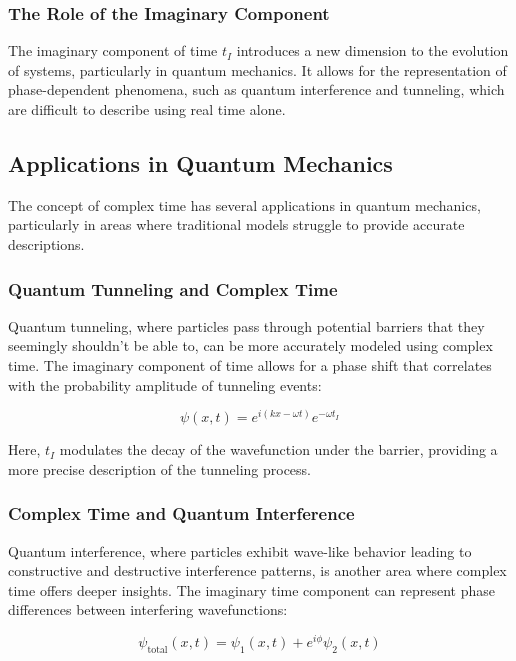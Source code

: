 \documentclass{article}
\begin{document}
\subsubsection{The Role of the Imaginary Component}

The imaginary component of time \( t_I \) introduces a new dimension to the evolution of systems, particularly in quantum mechanics. It allows for the representation of phase-dependent phenomena, such as quantum interference and tunneling, which are difficult to describe using real time alone.

\subsection{Applications in Quantum Mechanics}

The concept of complex time has several applications in quantum mechanics, particularly in areas where traditional models struggle to provide accurate descriptions.

\subsubsection{Quantum Tunneling and Complex Time}

Quantum tunneling, where particles pass through potential barriers that they seemingly shouldn’t be able to, can be more accurately modeled using complex time. The imaginary component of time allows for a phase shift that correlates with the probability amplitude of tunneling events:

\[
\psi(x, t) = e^{i \left( kx - \omega t \right)} e^{- \omega t_I}
\]

Here, \( t_I \) modulates the decay of the wavefunction under the barrier, providing a more precise description of the tunneling process.

\subsubsection{Complex Time and Quantum Interference}

Quantum interference, where particles exhibit wave-like behavior leading to constructive and destructive interference patterns, is another area where complex time offers deeper insights. The imaginary time component can represent phase differences between interfering wavefunctions:

\[
\psi_{\text{total}}(x, t) = \psi_1(x, t) + e^{i \phi} \psi_2(x, t)
\]
\end{document}
